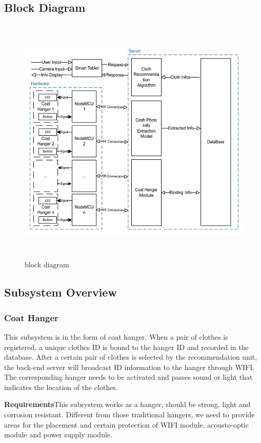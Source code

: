 \subsection{Block Diagram}
\begin{figure}[h]
    \centering
    \includegraphics[width=12cm,height=12cm]{graph/block diagram.jpg}
    \caption{block diagram}
    \end{figure}

\subsection{Subsystem Overview}
\subsubsection{Coat Hanger}
\setlength{\parindent}{2em}This subsystem is in the form of coat hanger. When a pair of clothes is registered, a unique clothes ID is bound to the hanger ID and recorded in the database. After a certain pair of clothes is selected by the recommendation unit, the back-end server will broadcast ID information to the hanger through WIFI. The corresponding hanger needs to be activated and passes sound or light that indicates the location of the clothes.  

\noindent\textbf{Requirements}\quad This subsystem works as a hanger, should be strong, light and corrosion resistant. Different from those traditional hangers, we need to provide areas for the placement and certain protection of WIFI module, acousto-optic module and power supply module.    


